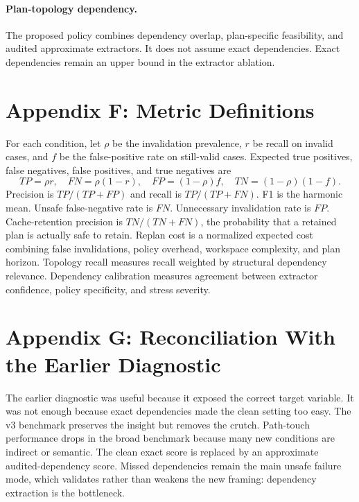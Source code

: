 \documentclass{article}
\begin{document}
\paragraph{Plan-topology dependency.}
The proposed policy combines dependency overlap, plan-specific feasibility, and audited approximate extractors. It does not assume exact dependencies. Exact dependencies remain an upper bound in the extractor ablation.

\section{Appendix F: Metric Definitions}

For each condition, let $\rho$ be the invalidation prevalence, $r$ be recall on invalid cases, and $f$ be the false-positive rate on still-valid cases. Expected true positives, false negatives, false positives, and true negatives are
\[
    TP=\rho r,\quad FN=\rho(1-r),\quad FP=(1-\rho)f,\quad TN=(1-\rho)(1-f).
\]
Precision is $TP/(TP+FP)$ and recall is $TP/(TP+FN)$. F1 is the harmonic mean. Unsafe false-negative rate is $FN$. Unnecessary invalidation rate is $FP$. Cache-retention precision is $TN/(TN+FN)$, the probability that a retained plan is actually safe to retain. Replan cost is a normalized expected cost combining false invalidations, policy overhead, workspace complexity, and plan horizon. Topology recall measures recall weighted by structural dependency relevance. Dependency calibration measures agreement between extractor confidence, policy specificity, and stress severity.

\section{Appendix G: Reconciliation With the Earlier Diagnostic}

\begin{table}[h]
\centering
\resizebox{\linewidth}{!}{}
\caption{Reconciliation with the earlier small diagnostic. The v3 benchmark changes the conclusion from an oracle mechanism note to an approximate-dependency evaluation.}
\label{tab:reconciliation}
\end{table}

The earlier diagnostic was useful because it exposed the correct target variable. It was not enough because exact dependencies made the clean setting too easy. The v3 benchmark preserves the insight but removes the crutch. Path-touch performance drops in the broad benchmark because many new conditions are indirect or semantic. The clean exact score is replaced by an approximate audited-dependency score. Missed dependencies remain the main unsafe failure mode, which validates rather than weakens the new framing: dependency extraction is the bottleneck.
\end{document}
